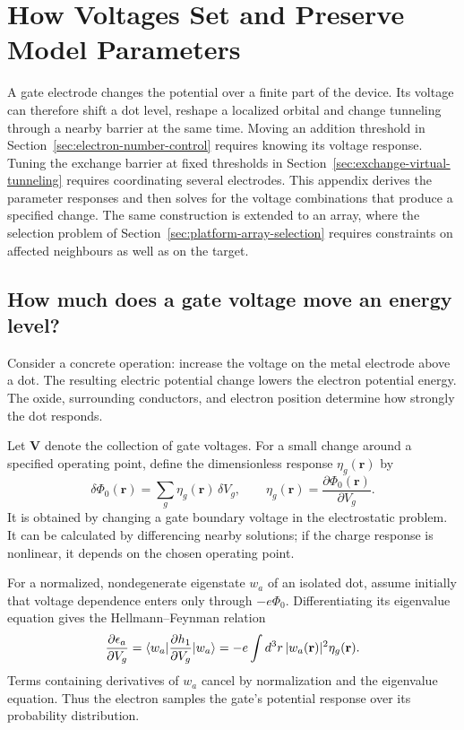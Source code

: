 \FloatBarrier
\section{How Voltages Set and Preserve Model Parameters}
\label{app:voltage-response}
\label{sec:device-parameter-dependence}

A gate electrode changes the potential over a finite part of the
device. Its voltage can therefore shift a dot level, reshape a
localized orbital and change tunneling through a nearby barrier
at the same time. Moving an addition threshold in
Section~\ref{sec:electron-number-control} requires knowing its voltage
response. Tuning the exchange barrier at fixed thresholds in
Section~\ref{sec:exchange-virtual-tunneling} requires coordinating
several electrodes. This appendix derives the parameter responses
and then solves for the voltage combinations that produce a specified
change. The same construction is extended to an array, where the
selection problem of Section~\ref{sec:platform-array-selection}
requires constraints on affected neighbours as well as on the target.

\subsection{How much does a gate voltage move an energy level?}

Consider a concrete operation: increase the voltage
on the metal electrode above a dot. The resulting electric
potential change lowers the electron potential energy.
The oxide, surrounding conductors, and electron position determine
how strongly the dot responds.

Let $\mathbf V$ denote the collection of gate voltages.
For a small change around a specified operating point, define
the dimensionless response $\eta_g(\mathbf r)$ by
\begin{equation}
 \delta\Phi_0(\mathbf r)
    =\sum_g\eta_g(\mathbf r)\,\delta V_g,
 \qquad
 \eta_g(\mathbf r)=
       \frac{\partial\Phi_0(\mathbf r)}{\partial V_g}.
 \label{eq:device-voltage-response}
\end{equation}
It is obtained by changing a gate boundary voltage in the
electrostatic problem. It can be calculated by differencing
nearby solutions; if the charge response is nonlinear, it
depends on the chosen operating point.

For a normalized, nondegenerate eigenstate $w_a$ of an isolated
dot, assume initially that voltage dependence enters only through
$-e\Phi_0$. Differentiating its eigenvalue equation gives the
Hellmann--Feynman relation
\begin{equation}
 \frac{\partial\epsilon_a}{\partial V_g}
    =\bra{w_a}\frac{\partial h_1}{\partial V_g}\ket{w_a}
    =-e\int d^3r\,|w_a(\mathbf r)|^2\eta_g(\mathbf r).
 \label{eq:device-hellmann-feynman}
\end{equation}
Terms containing derivatives of $w_a$ cancel by normalization
and the eigenvalue equation. Thus the electron samples the
gate's potential response over its probability distribution.

